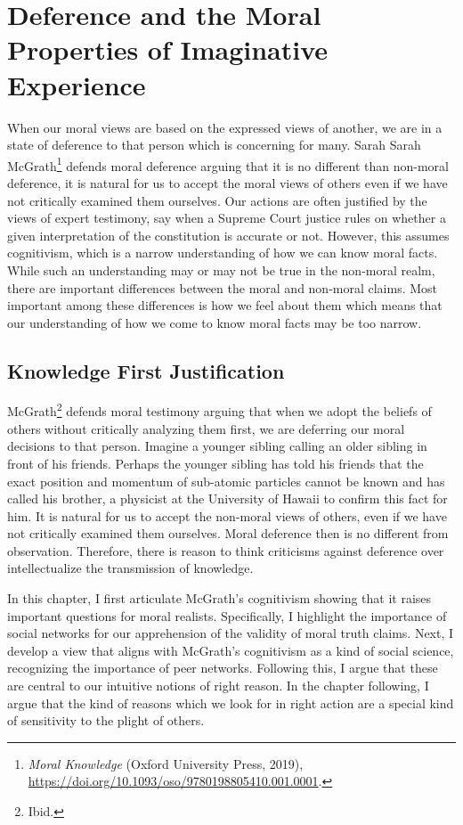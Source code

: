 \documentclass[phdthesis,12pt,final]{wuthesis}
\theoremstyle{definition}
\theoremstyle{definition}
\theoremstyle{definition}
\theoremstyle{definition}
\theoremstyle{remark}
\begin{document}
\chapter{Deference and the Moral Properties of Imaginative Experience}\label{deference-and-the-moral-properties-of-imaginative-experience}

When our moral views are based on the expressed views of another, we are in a state of deference to that person which is concerning for many. Sarah Sarah McGrath\footnote{\emph{Moral {Knowledge}} (Oxford University Press, 2019), \url{https://doi.org/10.1093/oso/9780198805410.001.0001}.} defends moral deference arguing that it is no different than non-moral deference, it is natural for us to accept the moral views of others even if we have not critically examined them ourselves. Our actions are often justified by the views of expert testimony, say when a Supreme Court justice rules on whether a given interpretation of the constitution is accurate or not. However, this assumes cognitivism, which is a narrow understanding of how we can know moral facts. While such an understanding may or may not be true in the non-moral realm, there are important differences between the moral and non-moral claims. Most important among these differences is how we feel about them which means that our understanding of how we come to know moral facts may be too narrow.

\section{Knowledge First Justification}\label{knowledge-first-justification}

McGrath\footnote{Ibid.} defends moral testimony arguing that when we adopt the beliefs of others without critically analyzing them first, we are deferring our moral decisions to that person. Imagine a younger sibling calling an older sibling in front of his friends. Perhaps the younger sibling has told his friends that the exact position and momentum of sub-atomic particles cannot be known and has called his brother, a physicist at the University of Hawaii to confirm this fact for him. It is natural for us to accept the non-moral views of others, even if we have not critically examined them ourselves. Moral deference then is no different from observation. Therefore, there is reason to think criticisms against deference over intellectualize the transmission of knowledge.

In this chapter, I first articulate McGrath's cognitivism showing that it raises important questions for moral realists. Specifically, I highlight the importance of social networks for our apprehension of the validity of moral truth claims. Next, I develop a view that aligns with McGrath's cognitivism as a kind of social science, recognizing the importance of peer networks. Following this, I argue that these are central to our intuitive notions of right reason. In the chapter following, I argue that the kind of reasons which we look for in right action are a special kind of sensitivity to the plight of others.
\end{document}

